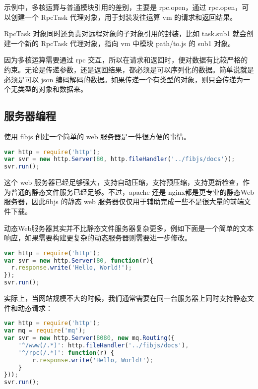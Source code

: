 示例中，多核运算与普通模块引用的差别，主要是 rpc.open，通过 rpc.open，可以创建一个 RpcTask 代理对象，用于封装发往运算 vm 的请求和返回结果。


RpcTask 对象同时还负责对远程对象的子对象引用的封装，比如 task.sub1 就会创建一个新的 RpcTask 代理对象，指向 vm 中模块 path/to.js 的 sub1 对象。


因为多核运算需要通过 rpc 交互，所以在请求和返回时，便对数据有比较严格的约束。无论是传递参数，还是返回结果，都必须是可以序列化的数据。简单说就是必须是可以 json 编码解码的数据。如果传递一个有类型的对象，则只会传递为一个无类型的对象和数据来。


\subsection{服务器编程}


使用 fibjs 创建一个简单的 web 服务器是一件很方便的事情。




\begin{lstlisting}[language=JavaScript]
var http = require('http');
var svr = new http.Server(80, http.fileHandler('../fibjs/docs'));
svr.run();
\end{lstlisting}

这个 web 服务器已经足够强大，支持自动压缩，支持预压缩，支持更新检查，作为普通的静态文件服务已经足够。不过，apache 还是 nginx都是更专业的静态Web服务器，因此fibjs 的静态 web 服务器仅仅用于辅助完成一些不是很大量的前端文件下载。

动态Web服务器其实并不比静态文件服务器复杂更多，例如下面是一个简单的文本响应，如果需要构建更复杂的动态服务器则需要进一步修改。


\begin{lstlisting}[language=JavaScript]
var http = require('http');
var svr = new http.Server(80, function(r){
  r.response.write('Hello, World!');
});
svr.run();
\end{lstlisting}

实际上，当网站规模不大的时候，我们通常需要在同一台服务器上同时支持静态文件和动态请求：


\begin{lstlisting}[language=JavaScript]
var http = require('http');
var mq = require('mq');
var svr = new http.Server(8080, new mq.Routing({
    '^/www(/.*)': http.fileHandler('../fibjs/docs'),
    '^/rpc(/.*)': function(r) {
        r.response.write('Hello, World!');
    }
}));
svr.run();
\end{lstlisting}




